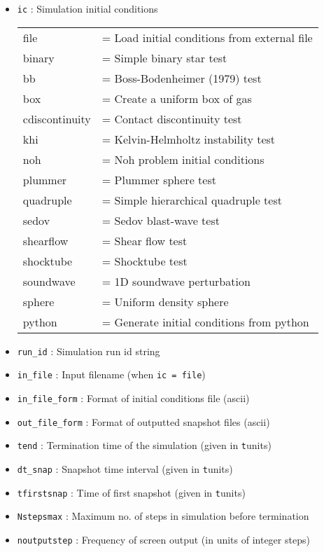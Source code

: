 \documentclass[a4paper]{article}
\newcommand{\var}[1]{\texttt{#1}}
\begin{document}
\begin{itemize}
\item \var{ic} : Simulation initial conditions \vspace{0.1cm} \\
\begin{tabular}{ll}
file              & = Load initial conditions from external file \\
binary            & = Simple binary star test \\
bb                & = Boss-Bodenheimer (1979) test \\
box               & = Create a uniform box of gas \\
cdiscontinuity    & = Contact discontinuity test \\
khi               & = Kelvin-Helmholtz instability test \\
noh               & = Noh problem initial conditions \\
plummer           & = Plummer sphere test \\
quadruple         & = Simple hierarchical quadruple test \\
sedov             & = Sedov blast-wave test \\
shearflow         & = Shear flow test \\
shocktube         & = Shocktube test \\
soundwave         & = 1D soundwave perturbation \\
sphere            & = Uniform density sphere \\
python            & = Generate initial conditions from python
\end{tabular}

\item \var{run\_id}  : Simulation run id string

\item \var{in\_file} : Input filename (when \var{ic = file})

\item \var{in\_file\_form} : Format of initial conditions file
                      (ascii)

\item \var{out\_file\_form} : Format of outputted snapshot files
                      (ascii)

\item \var{tend} : Termination time of the simulation (given in {\var tunit}s)

\item \var{dt\_snap} : Snapshot time interval (given in {\var tunit}s)

\item \var{tfirstsnap} : Time of first snapshot (given in {\var tunit}s)

\item \var{Nstepsmax} : Maximum no. of steps in simulation before termination

\item \var{noutputstep} : Frequency of screen output (in units of integer steps)


\end{itemize}
\end{document}
